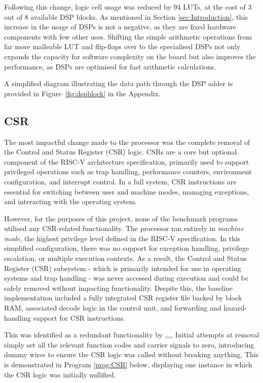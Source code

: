 \documentclass[a4paper,10pt]{article}
\begin{document}
Following this change, logic cell usage was reduced by 94 LUTs, 
at the cost of 3 out of 8 available DSP blocks. 
As mentioned in Section \ref{sec:Introduction},
this increase in the usage of DSPs is not a negative,
as they are fixed hardware components with few other uses.
Shifting the simple arithmetic operations from 
far more malleable LUT and flip-flops over to the specialised DSPs
not only expands the capacity for software complexity on the board
but also improves the performance,
as DSPs are optimised for fast arithmetic calculations.

A simplified diagram illustrating the data path through the DSP adder 
is provided in Figure~\ref{fig:dspblock} in the Appendix.

\subsection{CSR}
\label{sec:CSR}

The most impactful change made to the processor was the complete removal of the 
Control and Status Register (CSR) logic. 
CSRs are a core but optional component of the RISC-V architecture specification, 
primarily used to support privileged operations such as 
trap handling, performance counters, environment configuration, and interrupt control. 
In a full system, CSR instructions are essential for switching between user and machine 
modes, managing exceptions, and interacting with the operating system.

However, for the purposes of this project, none of the benchmark programs utilised 
any CSR-related functionality. 
The processor ran entirely in \textit{machine mode}, 
the highest privilege level defined in the RISC-V specification. 
In this simplified configuration, 
there was no support for exception handling, privilege escalation, 
or multiple execution contexts. 
As a result, the Control and Status Register (CSR) subsystem - 
which is primarily intended for use in operating systems and trap handling - 
was never accessed during execution and could be safely removed 
without impacting functionality.
Despite this, the baseline implementation included a fully 
integrated CSR register file backed by block RAM, associated decode logic in the 
control unit, and forwarding and hazard-handling support for CSR instructions.

This was identified as a redundant functionality by ,,,, 
Initial attempts at removal simply set 
all the relevant function codes and carrier signals to zero,
introducing dummy wires to ensure the CSR logic was called without breaking anything.
This is demonstrated in Program \ref{prog:CSR} below,
displaying one instance in which the CSR logic was initially nullified.
\end{document}
